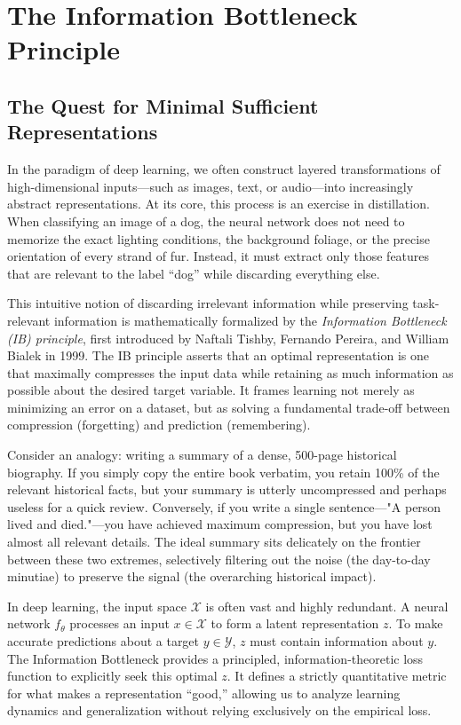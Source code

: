 \chapter{The Information Bottleneck Principle}
\label{chap:information_bottleneck}

\section{The Quest for Minimal Sufficient Representations}

In the paradigm of deep learning, we often construct layered transformations of high-dimensional inputs---such as images, text, or audio---into increasingly abstract representations. At its core, this process is an exercise in distillation. When classifying an image of a dog, the neural network does not need to memorize the exact lighting conditions, the background foliage, or the precise orientation of every strand of fur. Instead, it must extract only those features that are relevant to the label ``dog'' while discarding everything else. 

This intuitive notion of discarding irrelevant information while preserving task-relevant information is mathematically formalized by the \textit{Information Bottleneck (IB) principle}, first introduced by Naftali Tishby, Fernando Pereira, and William Bialek in 1999. The IB principle asserts that an optimal representation is one that maximally compresses the input data while retaining as much information as possible about the desired target variable. It frames learning not merely as minimizing an error on a dataset, but as solving a fundamental trade-off between compression (forgetting) and prediction (remembering).

Consider an analogy: writing a summary of a dense, 500-page historical biography. If you simply copy the entire book verbatim, you retain 100\% of the relevant historical facts, but your summary is utterly uncompressed and perhaps useless for a quick review. Conversely, if you write a single sentence---"A person lived and died."---you have achieved maximum compression, but you have lost almost all relevant details. The ideal summary sits delicately on the frontier between these two extremes, selectively filtering out the noise (the day-to-day minutiae) to preserve the signal (the overarching historical impact). 

In deep learning, the input space $\mathcal{X}$ is often vast and highly redundant. A neural network $f_\theta$ processes an input $x \in \mathcal{X}$ to form a latent representation $z$. To make accurate predictions about a target $y \in \mathcal{Y}$, $z$ must contain information about $y$. The Information Bottleneck provides a principled, information-theoretic loss function to explicitly seek this optimal $z$. It defines a strictly quantitative metric for what makes a representation ``good,'' allowing us to analyze learning dynamics and generalization without relying exclusively on the empirical loss.

